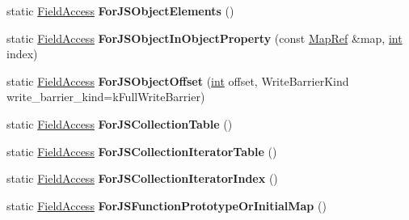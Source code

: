 \begin{DoxyCompactItemize}
static \mbox{\hyperlink{structv8_1_1internal_1_1compiler_1_1FieldAccess}{Field\+Access}} {\bfseries For\+J\+S\+Object\+Elements} ()
\item 
\mbox{\label{classv8_1_1internal_1_1compiler_1_1AccessBuilder_ae012f6271eaaa938e020c39b4cc7ecb8}} 
static \mbox{\hyperlink{structv8_1_1internal_1_1compiler_1_1FieldAccess}{Field\+Access}} {\bfseries For\+J\+S\+Object\+In\+Object\+Property} (const \mbox{\hyperlink{classv8_1_1internal_1_1compiler_1_1MapRef}{Map\+Ref}} \&map, \mbox{\hyperlink{classint}{int}} index)
\item 
\mbox{\label{classv8_1_1internal_1_1compiler_1_1AccessBuilder_a24df5536fec134ec94f386fada988aee}} 
static \mbox{\hyperlink{structv8_1_1internal_1_1compiler_1_1FieldAccess}{Field\+Access}} {\bfseries For\+J\+S\+Object\+Offset} (\mbox{\hyperlink{classint}{int}} offset, Write\+Barrier\+Kind write\+\_\+barrier\+\_\+kind=k\+Full\+Write\+Barrier)
\item 
\mbox{\label{classv8_1_1internal_1_1compiler_1_1AccessBuilder_a1fe5371fb832bfba18b6856d36eb1446}} 
static \mbox{\hyperlink{structv8_1_1internal_1_1compiler_1_1FieldAccess}{Field\+Access}} {\bfseries For\+J\+S\+Collection\+Table} ()
\item 
\mbox{\label{classv8_1_1internal_1_1compiler_1_1AccessBuilder_a051b7d4428edceee9635b13702470d93}} 
static \mbox{\hyperlink{structv8_1_1internal_1_1compiler_1_1FieldAccess}{Field\+Access}} {\bfseries For\+J\+S\+Collection\+Iterator\+Table} ()
\item 
\mbox{\label{classv8_1_1internal_1_1compiler_1_1AccessBuilder_a3f9593bcf3be1d49460f40b625782aa8}} 
static \mbox{\hyperlink{structv8_1_1internal_1_1compiler_1_1FieldAccess}{Field\+Access}} {\bfseries For\+J\+S\+Collection\+Iterator\+Index} ()
\item 
\mbox{\label{classv8_1_1internal_1_1compiler_1_1AccessBuilder_ae67ee224508da0a19ca07ad72ac025ec}} 
static \mbox{\hyperlink{structv8_1_1internal_1_1compiler_1_1FieldAccess}{Field\+Access}} {\bfseries For\+J\+S\+Function\+Prototype\+Or\+Initial\+Map} ()

\end{DoxyCompactItemize}

